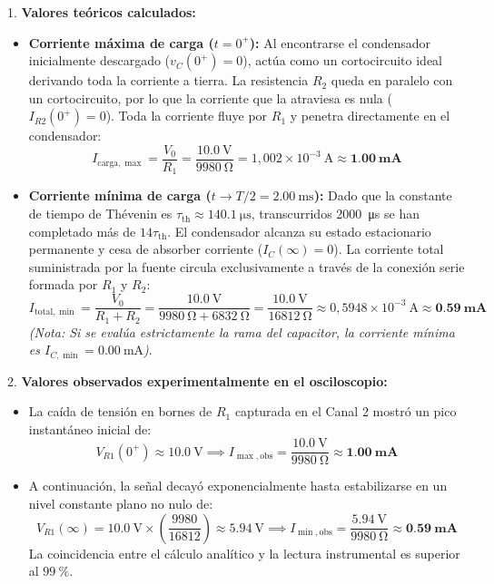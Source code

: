 \begin{appendices}
1. \textbf{Valores teóricos calculados:}
\begin{itemize}
    \item \textbf{Corriente máxima de carga ($t = 0^+$):}
    Al encontrarse el condensador inicialmente descargado ($v_C(0^+) = 0$), actúa como un cortocircuito ideal derivando toda la corriente a tierra. La resistencia $R_2$ queda en paralelo con un cortocircuito, por lo que la corriente que la atraviesa es nula ($I_{R2}(0^+) = 0$). Toda la corriente fluye por $R_1$ y penetra directamente en el condensador:
    \begin{equation*}
        I_{\text{carga},\max} = \frac{V_0}{R_1} = \frac{\qty{10,0}{\volt}}{\qty{9980}{\ohm}} = 1{,}002 \times 10^{-3}\ \unit{\ampere} \approx \mathbf{\qty{1,00}{\milli\ampere}}
    \end{equation*}
    
    \item \textbf{Corriente mínima de carga ($t \to T/2 = \qty{2,00}{\milli\second}$):}
    Dado que la constante de tiempo de Thévenin es $\tau_{\text{th}} \approx \qty{140,1}{\micro\second}$, transcurridos \qty{2000}{\micro\second} se han completado más de $14\tau_{\text{th}}$. El condensador alcanza su estado estacionario permanente y cesa de absorber corriente ($I_C(\infty) = 0$). La corriente total suministrada por la fuente circula exclusivamente a través de la conexión serie formada por $R_1$ y $R_2$:
    \begin{equation*}
        I_{\text{total},\min} = \frac{V_0}{R_1 + R_2} = \frac{\qty{10,0}{\volt}}{\qty{9980}{\ohm} + \qty{6832}{\ohm}} = \frac{\qty{10,0}{\volt}}{\qty{16812}{\ohm}} \approx 0{,}5948 \times 10^{-3}\ \unit{\ampere} \approx \mathbf{\qty{0,59}{\milli\ampere}}
    \end{equation*}
    \textit{(Nota: Si se evalúa estrictamente la rama del capacitor, la corriente mínima es $I_{C,\min} = \qty{0,00}{\milli\ampere}$)}.
\end{itemize}

2. \textbf{Valores observados experimentalmente en el osciloscopio:}
\begin{itemize}
    \item La caída de tensión en bornes de $R_1$ capturada en el Canal 2 mostró un pico instantáneo inicial de:
    \begin{equation*}
        V_{R1}(0^+) \approx \qty{10,0}{\volt} \implies I_{\max,\text{obs}} = \frac{\qty{10,0}{\volt}}{\qty{9980}{\ohm}} \approx \mathbf{\qty{1,00}{\milli\ampere}}
    \end{equation*}
    \item A continuación, la señal decayó exponencialmente hasta estabilizarse en un nivel constante plano no nulo de:
    \begin{equation*}
        V_{R1}(\infty) = \qty{10,0}{\volt} \times \left( \frac{9980}{16812} \right) \approx \qty{5,94}{\volt} \implies I_{\min,\text{obs}} = \frac{\qty{5,94}{\volt}}{\qty{9980}{\ohm}} \approx \mathbf{\qty{0,59}{\milli\ampere}}
    \end{equation*}
    La coincidencia entre el cálculo analítico y la lectura instrumental es superior al $\qty{99}{\percent}$.
\end{itemize}


\end{appendices}
